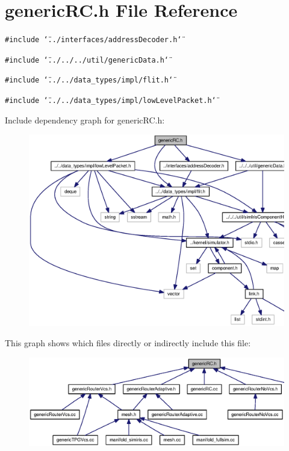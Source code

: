 \section{genericRC.h File Reference}
\label{genericRC_8h}
{\tt \#include \char`\"{}../interfaces/addressDecoder.h\char`\"{}}\par
{\tt \#include \char`\"{}../../../util/genericData.h\char`\"{}}\par
{\tt \#include \char`\"{}../../data\_\-types/impl/flit.h\char`\"{}}\par
{\tt \#include \char`\"{}../../data\_\-types/impl/lowLevelPacket.h\char`\"{}}\par


Include dependency graph for genericRC.h:\nopagebreak
\begin{figure}[H]
\begin{center}
\leavevmode
\includegraphics[width=357pt]{genericRC_8h__incl}
\end{center}
\end{figure}


This graph shows which files directly or indirectly include this file:\nopagebreak
\begin{figure}[H]
\begin{center}
\leavevmode
\includegraphics[width=358pt]{genericRC_8h__dep__incl}
\end{center}
\end{figure}
